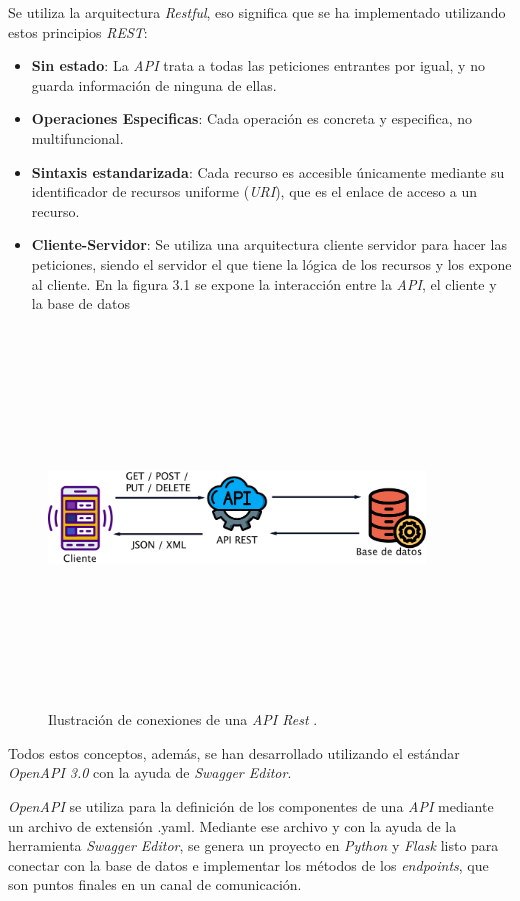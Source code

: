Se utiliza la arquitectura \textit{Restful}, eso significa que se ha implementado utilizando estos principios \textit{REST}\cite{apiRest}:
\begin{itemize}
    \item \textbf{Sin estado}: La \textit{API} trata a todas las peticiones entrantes por igual, y no guarda información de ninguna de ellas.
    \item \textbf{Operaciones Especificas}: Cada operación es concreta y especifica, no multifuncional.
    \item \textbf{Sintaxis estandarizada}: Cada recurso es accesible únicamente mediante su identificador de recursos uniforme (\textit{URI}), que es el enlace de acceso a un recurso.
    \item \textbf{Cliente-Servidor}: Se utiliza una arquitectura cliente servidor para hacer las peticiones, siendo el servidor el que tiene la lógica de los recursos y los expone al cliente.
En la figura 3.1 se expone la interacción entre la \textit{API}, el cliente y la base de datos
\end{itemize}
\begin{figure}[h]
    \centering
    \includegraphics[width=10cm,height=10cm,keepaspectratio]{img/Esquema API.png}
    \caption{Ilustración de conexiones de una \textit{API Rest} \cite{EsquemaAPI}.}
    \label{fig:example_GPS}
\end{figure}
\FloatBarrier
Todos estos conceptos, además, se han desarrollado utilizando el estándar \textit{OpenAPI 3.0} con la ayuda de \textit{Swagger Editor}. 

\textit{OpenAPI} se utiliza para la definición de los componentes de una \textit{API} mediante un archivo de extensión .yaml.
Mediante ese archivo y con la ayuda de la herramienta \textit{Swagger Editor}, se genera un proyecto en \textit{Python} y \textit{Flask} listo para conectar con la base de datos e implementar los métodos de los \textit{endpoints}, que son puntos finales en un canal de comunicación.






